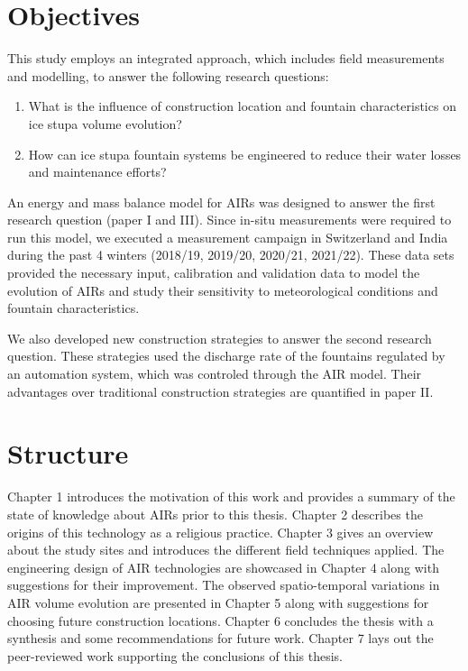 \section{Objectives}

This study employs an integrated approach, which includes field measurements and modelling, to answer the
following research questions:

\begin{enumerate}

	\item What is the influence of construction location and fountain characteristics on ice stupa volume evolution?

	\item How can ice stupa fountain systems be engineered to reduce their water losses and maintenance efforts?

\end{enumerate}

An energy and mass balance model for \ac{AIRs} was designed to answer the first research question (paper I and
III). Since in-situ measurements were required to run this model, we executed a measurement campaign in
Switzerland and India during the past 4 winters (2018/19, 2019/20, 2020/21, 2021/22). These data sets provided
the necessary input, calibration and validation data to model the evolution of \ac{AIRs} and study their
sensitivity to meteorological conditions and fountain characteristics.

We also developed new construction strategies to answer the second research question. These strategies used the
discharge rate of the fountains regulated by an automation system, which was controled through the AIR
model. Their advantages over traditional construction strategies are quantified in paper II.

\section{Structure}

Chapter 1 introduces the motivation of this work and provides a summary of the state of knowledge about \ac{AIRs}
prior to this thesis. Chapter 2 describes the origins of this technology as a religious practice. Chapter 3
gives an overview about the study sites and introduces the different field techniques applied. The engineering
design of AIR technologies are showcased in Chapter 4 along with suggestions for their improvement. The observed
spatio-temporal variations in AIR volume evolution are presented in Chapter 5 along with suggestions for
choosing future construction locations. Chapter 6 concludes the thesis with a synthesis and some recommendations
for future work. Chapter 7 lays out the peer-reviewed work supporting the conclusions of this thesis.

